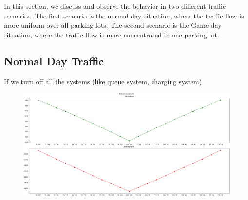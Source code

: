 In this section, we discuss and observe the behavior in two different traffic scenarios. The first scenario is the normal day situation, where the traffic flow is more uniform over all parking lots. The second scenario is the Game day situation, where the traffic flow is more concentrated in one parking lot.

\subsection{Normal Day Traffic}

If we turn off all the systems (like queue system, charging system)

\begin{figure}
    \centering
    \includegraphics[width=\textwidth]{figure/traffic_scenario/all_clean.png}
\end{figure}
